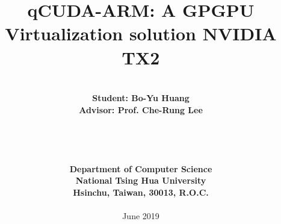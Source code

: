\documentclass[a4paper,12pt]{report}
\begin{document}

%

\title{\bf \huge qCUDA-ARM: A GPGPU Virtualization solution  NVIDIA TX2
}
\date{}
\author{
\begin{tabular}{c}
\\
\\
{\LARGE \bf Student: Bo-Yu Huang}\\
{\LARGE \bf Advisor: Prof. Che-Rung Lee}\\
\\
\\
\\
\\
{\LARGE \bf Department of Computer Science}\\
{\LARGE \bf National Tsing Hua University}\\
{\LARGE \bf Hsinchu, Taiwan, 30013, R.O.C.}\\
\\
{\large June 2019}
\end{tabular}
}

\maketitle
{}






%

\setcounter{page}{3}
\tableofcontents
\clearpage
{}
\listoffigures
\clearpage
{}
\listoftables
\clearpage
{}
\listofalgorithms
\clearpage


\setcounter{page}{1}



%







%
%
\end{document}
